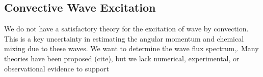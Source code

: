{\color{purple}
\subsection{Convective Wave Excitation}
}

We do not have a satisfactory theory for the excitation of wave by convection. This is a key uncertainty in estimating the angular momentum and chemical mixing due to these waves. We want to determine the wave flux spectrum,. Many theories have been proposed (cite), but we lack numerical, experimental, or observational evidence to support  
